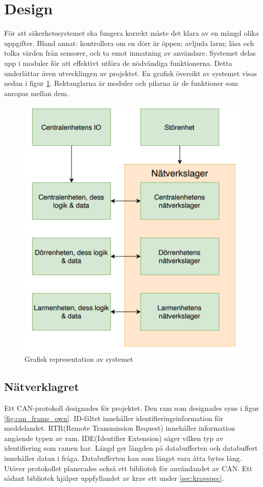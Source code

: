 \section{Design}
\label{sec:Design}

För att säkerhetssystemet ska fungera korrekt måste det klara av en mängd olika uppgifter. Bland annat: kontrollera om en dörr är öppen; avljuda larm; läsa och tolka värden från sensorer, och ta emot inmatning av användare. Systemet delas upp i moduler för att effektivt utföra de nödvändiga funktionerna. Detta underlättar även utvecklingen av projektet. En grafisk översikt av systemet visas nedan i figur \ref{fig:systemoversikt}. Rektanglarna är moduler och pilarna är de funktioner som anropas mellan dem.

\begin{figure}[H]
    \centering
    \includegraphics[scale=0.75]{dokumentation/projektplan/systemoversikt.png}
    \caption{Grafisk representation av systemet}
    \label{fig:systemoversikt}
\end{figure}


\subsection{Nätverklagret}
\label{sec:nätverklagretDE}
Ett CAN-protokoll designades för projektet. Den ram som designades syns
i figur \ref{fig:can_frame_own}. ID-fältet innehåller identifieringsinformation för meddelandet. RTR(Remote Transmission Request) innehåller information angående typen av ram. IDE(Identifier Extension) säger vilken typ av identifiering som ramen har. Längd ger längden på databufferten och databuffert
innehåller datan i fråga. Databufferten kan som längst vara åtta bytes lång. Utöver protokollet planerades också ett bibliotek för användandet av CAN. Ett sådant bibliotek hjälper uppfyllandet av krav ett under \ref{sec:kravspec}.


